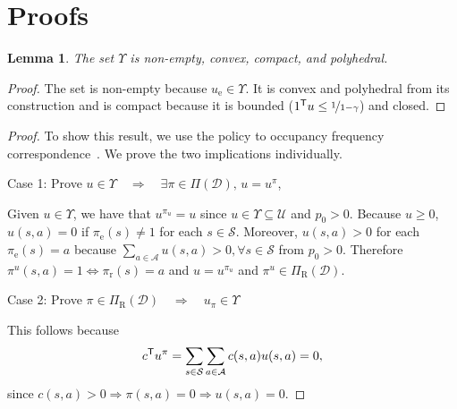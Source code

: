 \documentclass[10pt]{article}
\renewcommand{\cite}{\citep}
\theoremstyle{plain}
\newtheorem{lemma}{Lemma}
\theoremstyle{remark}
\begin{document}
%


\clearpage
\appendix
\section{Proofs} %

\begin{lemma}\label{prop:convexity_of_Upsilon}
The set $\Upsilon$ is non-empty, convex, compact, and polyhedral.
\end{lemma}
\begin{proof}
The set is non-empty because $u_{\mathrm{e}} \in \Upsilon$. It is convex and polyhedral from its construction and is compact because it is bounded ($1^{\mathsf{T}} u \le  \nicefrac{1}{1-\gamma}$) and closed.  
\end{proof}

\lemmaOccupancyExistance*
\begin{proof}
To show this result, we use the policy to occupancy frequency correspondence~\cite{Puterman1994}. We prove the two implications individually.

Case 1: Prove $u \in \Upsilon   \quad \Rightarrow \quad  \exists
        \pi \in \Pi(\mathcal{D}), \, u = u^{\pi}$,

Given $u \in \Upsilon$, we have that $u^{\pi_{u}} = u$ since $u\in \Upsilon \subseteq \mathcal{U}$ and $p_0 > 0$. Because $u \ge 0$, $u(s,a) = 0$ if $\pi_{\mathrm{e}}(s) \neq 1$ for each $s\in \mathcal{S}$. Moreover, $u(s,a) > 0$ for each $\pi_{\mathrm{e}}(s) = a$ because $\sum_{a\in \mathcal{A}} u(s,a) > 0, \forall s\in \mathcal{S}$ from $p_0 > 0$. Therefore $\pi^u(s,a) = 1 \Leftrightarrow \pi_{\mathrm{r}}(s) = a$ and $u = u^{\pi_{u}}$ and $\pi^u\in \Pi_{\mathrm{R}}(\mathcal{D})$.

Case 2: Prove $\pi \in \Pi_{\mathrm{R}}(\mathcal{D}) \quad \Rightarrow \quad  u_{\pi} \in
        \Upsilon $

        This follows because
\[
 c^{\mathsf{T}} u^{\pi} = \sum_{s\in \mathcal{S}} \sum_{a\in \mathcal{A}} c(s,a) u(s,a) = 0, 
\]
since $c(s,a) > 0 \Rightarrow \pi(s,a) = 0 \Rightarrow u(s,a) = 0$.
\end{proof}
\end{document}
